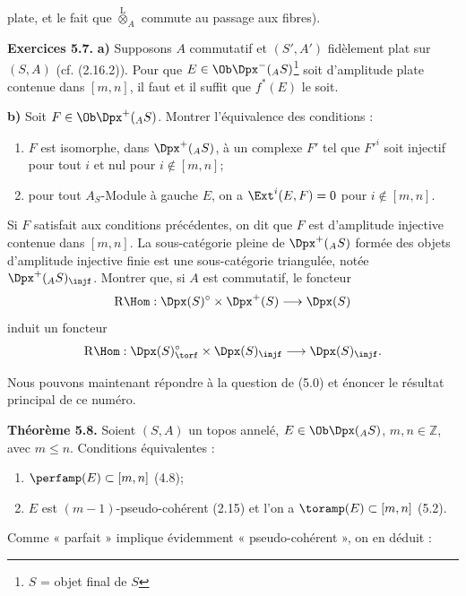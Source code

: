 plate, et le fait que \(\overset{\mathrm L}{\otimes}_A\) commute au passage aux fibres).

\textbf{Exercices 5.7.} \textbf{a)} Supposons \(A\) commutatif et \((S',A')\) fidèlement plat sur \((S,A)\) (cf. (2.16.2)). Pour que \(E\in\Ob\Dpx^-({}_A S)\)\footnote{\(S\) = objet final de \(S\)} soit d'amplitude plate contenue dans \([m,n]\), il faut et il suffit que \(f^*(E)\) le soit.

\textbf{b)} Soit \(F\in\Ob\Dpx^+({}_A S)\)\footnotemark[\value{footnote}]. Montrer l'équivalence des conditions :
\begin{enumerate}[label=(\roman*)]
\item \(F\) est isomorphe, dans \(\Dpx^+({}_A S)\), à un complexe \(F'\) tel que \(F'^i\) soit injectif pour tout \(i\) et nul pour \(i\notin[m,n]\);
\item pour tout \(A_S\)-Module à gauche \(E\), on a \(\Ext^i(E,F)=0\) pour \(i\notin[m,n]\).
\end{enumerate}
Si \(F\) satisfait aux conditions précédentes, on dit que \(F\) est d'amplitude injective contenue dans \([m,n]\). La sous-catégorie pleine de \(\Dpx^+({}_A S)\) formée des objets d'amplitude injective finie est une sous-catégorie triangulée, notée \(\Dpx^+({}_A S)_{\injf}\). Montrer que, si \(A\) est commutatif, le foncteur
\[
  \mathrm R\Hom:\Dpx(S)^\circ\times\Dpx^+(S)\longrightarrow \Dpx(S)
\]
induit un foncteur
\[
  \mathrm R\Hom:\Dpx(S)^\circ_{\torf}\times\Dpx(S)_{\injf}
  \longrightarrow \Dpx(S)_{\injf}.
\]

Nous pouvons maintenant répondre à la question de (5.0) et énoncer le résultat principal de ce numéro.

\textbf{Théorème 5.8.} Soient \((S,A)\) un topos annelé, \(E\in\Ob\Dpx({}_A S)\), \(m,n\in\mathbb Z\), avec \(m\leq n\). Conditions équivalentes :
\begin{enumerate}[label=(\roman*)]
\item \(\perfamp(E)\subset[m,n]\) (4.8);
\item \(E\) est \((m-1)\)-pseudo-cohérent (2.15) et l'on a \(\toramp(E)\subset[m,n]\) (5.2).
\end{enumerate}
Comme « parfait » implique évidemment « pseudo-cohérent », on en déduit :

